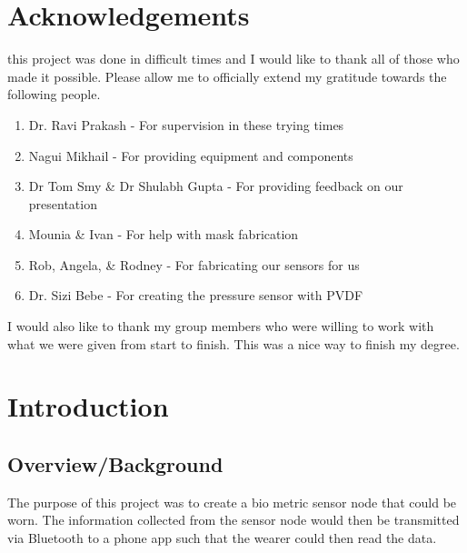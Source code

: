 \documentclass[12pt,a4paper]{report}
\begin{document}
\newpage
\vspace*{2in}
\section*{Acknowledgements}
this project was done in difficult times and I would like to thank all of those who made it possible. Please allow me to officially extend my gratitude towards the following people.

\begin{enumerate}
    \item[] Dr. Ravi Prakash - For supervision in these trying times
    \item[] Nagui Mikhail - For providing equipment and components
    \item[] Dr Tom Smy \& Dr Shulabh Gupta - For providing feedback on our presentation
    \item[] Mounia \& Ivan - For help with mask fabrication
    \item[] Rob, Angela, \& Rodney - For fabricating our sensors for us
    \item[] Dr. Sizi Bebe - For creating the pressure sensor with PVDF
\end{enumerate}

I would also like to thank my group members who were willing to work with what we were given from start to finish. This was a nice way to finish my degree.



\newpage
\tableofcontents
\newpage
\listoftables
\begingroup
\let\clearpage\relax
\listoffigures
\endgroup

\newpage

\renewcommand{\thesection}{\arabic{section}}




\section{Introduction}

\subsection{Overview/Background}

The purpose of this project was to create a bio metric sensor node that could be worn. The information collected from the sensor node would then be transmitted via Bluetooth to a phone app such that the wearer could then read the data. \par
\end{document}

